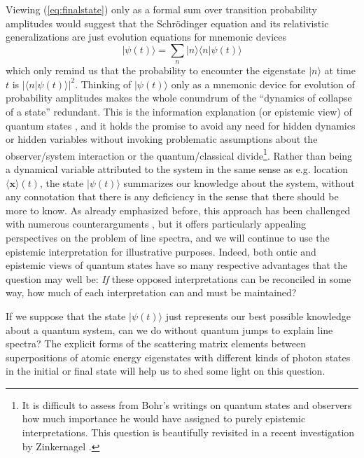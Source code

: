 \documentclass[final,3p,12pt]{elsarticle3}
\begin{document}
Viewing (\ref{eq:finalstate}) only as a formal sum over transition 
probability amplitudes would suggest that the Schr\"odinger
equation and its relativistic generalizations are just evolution
equations for mnemonic devices
\[
\bm{|}\psi(t)\bm{\rangle}=\sum_n\bm{|}n\bm{\rangle}\bm{\langle} n\bm{|}\psi(t)\bm{\rangle}
\]
which only remind us that the probability to encounter the
eigenstate $\bm{|}n\bm{\rangle}$ at time $t$ is $|\bm{\langle} n\bm{|}\psi(t)\bm{\rangle}|^2$.
Thinking of $\bm{|}\psi(t)\bm{\rangle}$ only as a mnemonic 
device for evolution of probability amplitudes makes the whole 
conundrum of the ``dynamics of collapse of a state'' redundant. This is the 
information explanation (or epistemic view) of quantum 
states \cite{fuchs,qb1,ferrero,spekkens,qb2}, and it holds the promise to 
avoid any need for hidden dynamics or hidden variables without invoking 
problematic assumptions about the observer/system interaction
or the quantum/classical divide\footnote{It is difficult to assess from
Bohr's writings on quantum states and observers how much importance he 
would have assigned
to purely epistemic interpretations. This question is beautifully 
revisited in a recent investigation by Zinkernagel \cite{BohrZ}.}.
Rather than being a dynamical variable attributed to the system in the 
same sense as e.g. location $\langle\bm{x}\rangle(t)$, the 
state $\bm{|}\psi(t)\bm{\rangle}$ summarizes our knowledge about the system, without 
any connotation that there is any deficiency in the sense that there should 
be more to know. As already emphasized before,
this approach has been challenged with numerous counterarguments
\cite{realpsia,realpsi0,realpsi1,realpsi2,realpsi3,realpsi4,realpsi5,realpsi6},
but it offers particularly appealing perspectives on the problem of line spectra,
and we will continue to use the epistemic interpretation for illustrative
purposes. Indeed, both ontic and epistemic views of quantum states have
so many respective advantages that the question may well be: {\it If} these
opposed interpretations can be reconciled in some way, how much of
each interpretation can and must be maintained?

If we suppose that the state $\bm{|}\psi(t)\bm{\rangle}$ just represents our best 
possible knowledge about a quantum system, can we do without quantum jumps to 
explain line spectra? The explicit forms of the scattering matrix elements 
between superpositions of atomic energy eigenstates with different kinds of
photon states in the initial or final state will help us to shed some light 
on this question.
\end{document}
